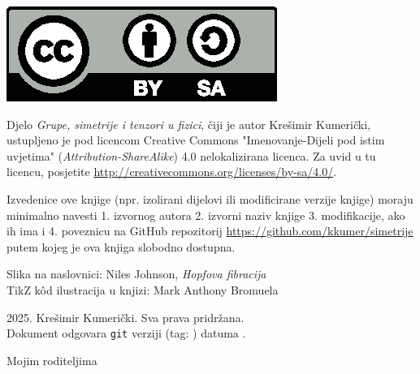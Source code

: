 
\thispagestyle{empty}

\vspace*{20em}


\centerline{\includegraphics[scale=1.0,clip]{pics/by-sa.eps}}
Djelo \emph{Grupe, simetrije i tenzori u fizici}, čiji je autor Krešimir
Kumerički, ustupljeno je pod licencom Creative Commons 
"Imenovanje-Dijeli pod istim uvjetima" (\emph{Attribution-ShareAlike}) 
4.0 nelokalizirana licenca. Za uvid u tu licencu, posjetite
\url{http://creativecommons.org/licenses/by-sa/4.0/}.

Izvedenice ove knjige (npr. izolirani dijelovi ili modificirane verzije knjige) moraju minimalno
navesti 1. izvornog autora 2. izvorni naziv knjige 3. modifikacije, ako ih ima i
4. poveznicu na GitHub repozitorij
\url{https://github.com/kkumer/simetrije} putem kojeg je ova knjiga
slobodno dostupna.

\vspace*{5em}
Slika na naslovnici: Niles Johnson, \emph{Hopfova fibracija}\\
TikZ k\^{o}d ilustracija u knjizi: Mark Anthony Bromuela

\vspace*{5em}
\textcopyright{} 2025. Krešimir Kumerički. Sva prava pridržana.\\
\small
Dokument odgovara \texttt{git} verziji \texttt{\githash} (tag: \texttt{\gittag}) datuma \gitdate.

\cleardoublepage
\thispagestyle{empty}
\vspace*{20em}
\begin{flushright}
Mojim roditeljima
\end{flushright}
\cleardoublepage
